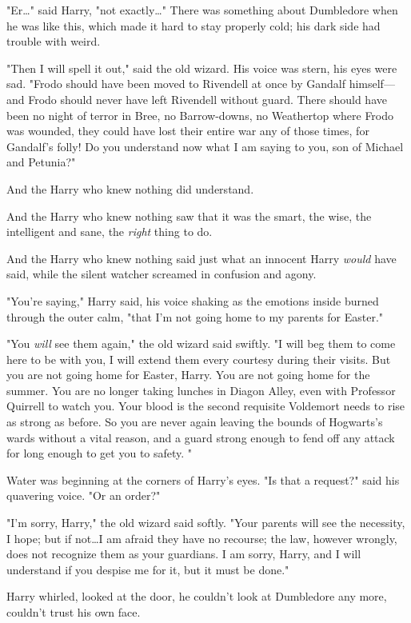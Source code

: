 "Er…" said Harry, "not exactly…" There was something about
Dumbledore when he was like this, which made it hard to stay properly cold; his
dark side had trouble with weird.

"Then I will spell it out," said the old wizard. His voice was stern, his eyes
were sad. "Frodo should have been moved to Rivendell at once by Gandalf
himself---and Frodo should never have left Rivendell without guard. There
should have been no night of terror in Bree, no Barrow-downs, no Weathertop
where Frodo was wounded, they could have lost their entire war any of those
times, for Gandalf's folly! Do you understand now what I am saying to you, son
of Michael and Petunia?"

And the Harry who knew nothing did understand.

And the Harry who knew nothing saw that it was the smart, the wise, the
intelligent and sane, the \emph{right} thing to do.

And the Harry who knew nothing said just what an innocent Harry \emph{would}
have said, while the silent watcher screamed in confusion and agony.

"You're saying," Harry said, his voice shaking as the emotions inside burned
through the outer calm, "that I'm not going home to my parents for Easter."

"You \emph{will} see them again," the old wizard said swiftly. "I will beg them
to come here to be with you, I will extend them every courtesy during their
visits. But you are not going home for Easter, Harry. You are not going home
for the summer. You are no longer taking lunches in Diagon Alley, even with
Professor Quirrell to watch you. Your blood is the second requisite Voldemort
needs to rise as strong as before. So you are never again leaving the bounds of
Hogwarts's wards without a vital reason, and a guard strong enough to fend off
any attack for long enough to get you to safety. "

Water was beginning at the corners of Harry's eyes. "Is that a request?" said
his quavering voice. "Or an order?"

"I'm sorry, Harry," the old wizard said softly. "Your parents will see the
necessity, I hope; but if not…I am afraid they have no recourse; the
law, however wrongly, does not recognize them as your guardians. I am sorry,
Harry, and I will understand if you despise me for it, but it must be done."

Harry whirled, looked at the door, he couldn't look at Dumbledore any more,
couldn't trust his own face.

